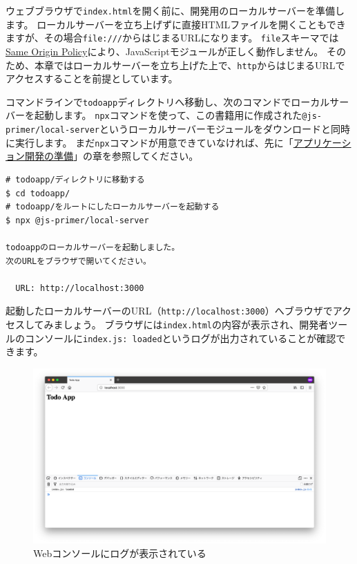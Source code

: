 ウェブブラウザで\texttt{index.html}を開く前に、開発用のローカルサーバーを準備します。
ローカルサーバーを立ち上げずに直接HTMLファイルを開くこともできますが、その場合\texttt{file:///}からはじまるURLになります。
\texttt{file}スキーマでは\href{https://developer.mozilla.org/ja/docs/Web/Security/Same-origin_policy}{Same
Origin Policy}により、JavaScriptモジュールが正しく動作しません。
そのため、本章ではローカルサーバーを立ち上げた上で、\texttt{http}からはじまるURLでアクセスすることを前提としています。

コマンドラインで\texttt{todoapp}ディレクトリへ移動し、次のコマンドでローカルサーバーを起動します。
\texttt{npx}コマンドを使って、この書籍用に作成された\texttt{@js-primer/local-server}というローカルサーバーモジュールをダウンロードと同時に実行します。
まだ\texttt{npx}コマンドが用意できていなければ、先に「\href{../../setup-local-env/README.md}{アプリケーション開発の準備}」の章を参照してください。

\begin{lstlisting}
# todoapp/ディレクトリに移動する
$ cd todoapp/
# todoapp/をルートにしたローカルサーバーを起動する
$ npx @js-primer/local-server

todoappのローカルサーバーを起動しました。
次のURLをブラウザで開いてください。

  URL: http://localhost:3000
\end{lstlisting}

起動したローカルサーバーのURL（\texttt{http://localhost:3000}）へブラウザでアクセスしてみましょう。
ブラウザには\texttt{index.html}の内容が表示され、開発者ツールのコンソールに\texttt{index.js: loaded}というログが出力されていることが確認できます。

\begin{figure}
\centering
\includegraphics[width=120mm]{fig/first-entry.png}
\caption{Webコンソールにログが表示されている}
\end{figure}

